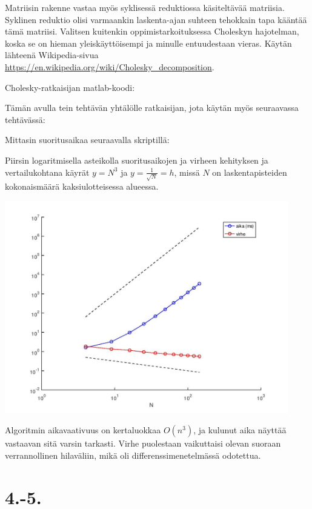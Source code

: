 \documentclass{article}
\begin{document}
Matriisin rakenne vastaa myös syklisessä reduktiossa käsiteltävää matriisia.
Syklinen reduktio olisi varmaankin laskenta-ajan suhteen tehokkain tapa kääntää
tämä matriisi. Valitsen kuitenkin oppimistarkoituksessa Choleskyn hajotelman,
koska se on hieman yleiskäyttöisempi ja minulle entuudestaan vieras.
Käytän lähteenä Wikipedia-sivua \url{https://en.wikipedia.org/wiki/Cholesky_decomposition}.

Cholesky-ratkaisijan matlab-koodi:



Tämän avulla tein tehtävän yhtälölle ratkaisijan, jota käytän myös seuraavassa tehtävässä:



Mittasin suoritusaikaa seuraavalla skriptillä:



Piirsin logaritmisella asteikolla suoritusaikojen ja virheen kehityksen ja
vertailukohtana käyrät $y = N^3$ ja $y = \frac{1}{\sqrt{N}} = h$, missä $N$ on
laskentapisteiden kokonaismäärä kaksiulotteisessa alueessa.

\includegraphics[width=350pt]{w6_2.jpg}

Algoritmin aikavaativuus on kertaluokkaa $O(n^3)$, ja kulunut aika näyttää
vastaavan sitä varsin tar\-kasti.  Virhe puolestaan vaikuttaisi olevan suoraan
verrannollinen hilaväliin, mikä oli differenssi\-menetelmäs\-sä odotettua.

\newpage
\section*{4.-5.}
\end{document}
